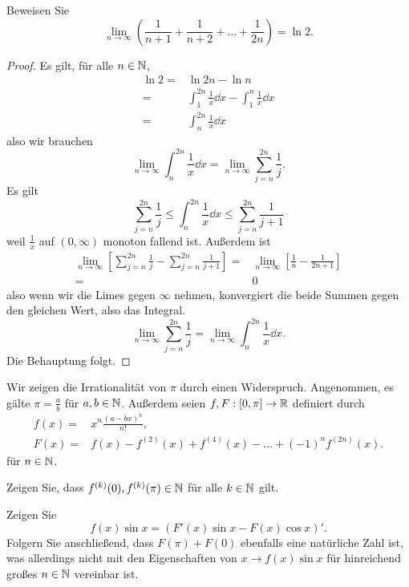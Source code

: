 \begin{Problem}
	Beweisen Sie
	\[
	\lim_{n \to \infty} \left( \frac{1}{n+1}+\frac{1}{n+2}+\dots+\frac{1}{2n} \right)=\ln 2 
	.\] 
\end{Problem}
\begin{proof}
	Es gilt, f\"{u}r alle $n\in \mathbb{N}$,
\begin{align*}
	\ln 2=&\ln 2n-\ln n\\
	=&\int_1^{2n} \frac{1}{x}\dd{x}-\int_1^n \frac{1}{x}\dd{x}\\
	=& \int_n^{2n}\frac{1}{x}\dd{x}
\end{align*}
also wir brauchen
\[
	\lim_{n \to \infty} \int_n^{2n}\frac{1}{x}\dd{x}=\lim_{n \to \infty} \sum_{j=n}^{2n}\frac{1}{j}
.\] 
Es gilt
\[
	\sum_{j=n}^{2n}\frac{1}{j}\le \int_n^{2n}\frac{1}{x}\dd{x}\le \sum_{j=n}^{2n} \frac{1}{j+1}
\]
weil $\frac{1}{x}$ auf $(0,\infty)$ monoton fallend ist. Außerdem ist
\begin{align*}
	\lim_{n \to \infty} \left[ \sum_{j=n}^{2n}\frac{1}{j}-\sum_{j=n}^{2n}\frac{1}{j+1} \right] =& \lim_{n \to \infty} \left[ \frac{1}{n}-\frac{1}{2n+1} \right] \\
	=& 0
\end{align*}
also wenn wir die Limes gegen $\infty$ nehmen, konvergiert die beide Summen gegen den gleichen Wert, also das Integral. 
\[
	\lim_{n \to \infty} \sum_{j=n}^{2n}\frac{1}{j}=\lim_{n \to \infty} \int_n^{2n}\frac{1}{x}\dd{x}
.\] 
Die Behauptung folgt.
\end{proof}
\begin{Problem}
	Wir zeigen die Irrationalität von $\pi$ durch einen Widerspruch. Angenommen, es gälte $\pi=\frac{a}{b}$ f\"{u}r $a,b\in \mathbb{N}$. Außerdem seien $f,F:[0,\pi]\to \mathbb{R}$ definiert durch
	\begin{align*}
		f(x)=&x^n\frac{(a-bx)^n}{n!},\\
		F(x)=&f(x)-f^{(2)}(x)+f^{(4)}(x)-\dots+(-1)^nf^{(2n)}(x).
	\end{align*}
	f\"{u}r $n\in \mathbb{N}$.
	\begin{parts}
	\item Zeigen Sie, dass $f^{(k)}(0),f^{(k)}(\pi)\in \mathbb{N}$ f\"{u}r alle $k\in \mathbb{N}$ gilt.
	\item Zeigen Sie
		\[
		f(x)\sin x=\left( F'(x)\sin x-F(x)\cos x \right)'
		.\] 
		Folgern Sie anschließend, dass $F(\pi)+F(0)$ ebenfalls eine natürliche Zahl ist, was allerdings nicht mit den Eigenschaften von $x\to f(x)\sin x$ f\"{u}r hinreichend großes $n\in \mathbb{N}$ vereinbar ist. 
	\end{parts}
\end{Problem}
